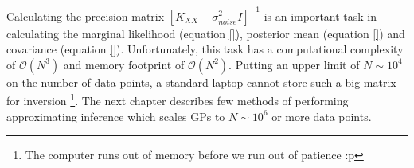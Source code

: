 Calculating the precision matrix $[K_{XX}+ \sigma_{noise}^{2}I]^{-1}$ is an important task in calculating the marginal likelihood (equation \ref{}), posterior mean (equation \ref{}) and covariance (equation \ref{}). Unfortunately, this task has a computational complexity of $\mathcal{O}\left ( N^{3} \right )$ and memory footprint of $\mathcal{O}\left ( N^{2} \right )$. Putting an upper limit of $N \sim 10^4$ on the number of data points, a standard laptop cannot store such a big matrix for inversion \footnote{The computer runs out of memory before we run out of patience :p}. The next chapter describes few methods of performing approximating inference which scales GPs to $N \sim 10^6$ or more data points. 
